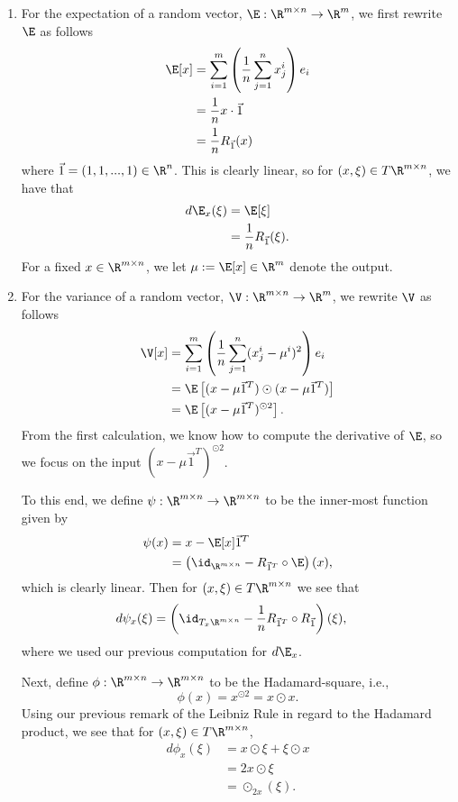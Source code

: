 \begin{enumerate}
	\item For the expectation of a random vector, $\E:\R^{m\times n}\to\R^m$, we first rewrite $\E$ as follows
	\begin{align*}
		\E[x]&=\sum_{i=1}^m\left(\frac{1}{n}\sum_{j=1}^nx^i_j\right)e_i\\
		&=\frac{1}{n}x\cdot\vec{1}\\
		&=\frac{1}{n}R_{\vec{1}}(x)
	\end{align*}
	where $\vec{1}=(1,1,...,1)\in\R^n$.  This is clearly linear, so for $(x,\xi)\in T\R^{m\times n}$, we have that
	\begin{align*}
		d\E_x(\xi)&=\E[\xi]\\
		&=\frac{1}{n}R_{\vec{1}}(\xi).
	\end{align*}
	For a fixed $x\in\R^{m\times n}$, we let $\mu:=\E[x]\in\R^m$ denote the output.
	
	\item For the variance of a random vector, $\V:\R^{m\times n}\to\R^m$, we rewrite $\V$ as follows
	\begin{align*}
		\V[x]&=\sum_{i=1}^m\left(\frac{1}{n}\sum_{j=1}^n(x^i_j-\mu^i)^2\right)e_i\\
		&=\E\left[(x-\mu\vec{1}^T)\odot(x-\mu\vec{1}^T)\right]\\
		&=\E\left[(x-\mu\vec{1}^T)^{\odot2}\right].
	\end{align*}
	From the first calculation, we know how to compute the derivative of $\E$, so we focus on the input $(x-\mu\vec{1}^T)^{\odot2}$.  
	
	To this end, we define $\psi:\R^{m\times n}\to\R^{m\times n}$ to be the inner-most function given by
	\begin{align*}
		\psi(x)&=x-\E[x]\vec{1}^T\\
		&=\left(\id_{\R^{m\times n}}-R_{\vec{1}^T}\circ\E\right)(x),
	\end{align*}
	which is clearly linear. Then for $(x,\xi)\in T\R^{m\times n}$ we see that
	\begin{align*}
		d\psi_x(\xi)&=\left(\id_{T_x\R^{m\times n}} - \frac{1}{n}R_{\vec{1}^T}\circ R_{\vec{1}}\right)(\xi),
	\end{align*}
	where we used our previous computation for $d\E_x$.
	
	Next, define $\phi:\R^{m\times n}\to\R^{m\times n}$ to be the Hadamard-square, i.e.,
	$$\phi(x)=x^{\odot2}=x\odot x.$$
	  Using our previous remark of the Leibniz Rule in regard to the Hadamard product, we see that for $(x,\xi)\in T\R^{m\times n}$,
	  \begin{align*}
	  	d\phi_x(\xi)&=x\odot\xi+\xi\odot x\\
	  	&=2x\odot\xi\\
	  	&=\odot_{2x}(\xi).
	  \end{align*}
	  

\end{enumerate}
